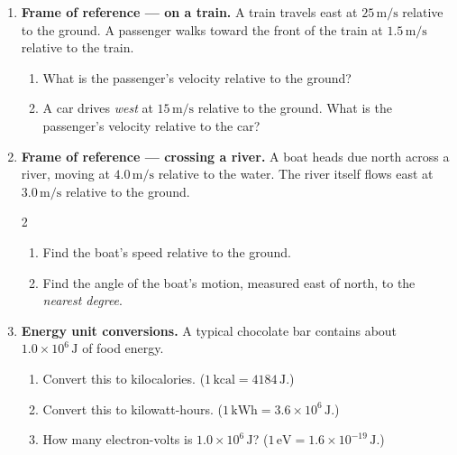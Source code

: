\documentclass[12pt, twoside]{article}
\begin{document}
\begin{enumerate}
\newpage

\item \textbf{Frame of reference --- on a train.} A train travels east at $25\,\text{m/s}$ relative to the ground. A passenger walks toward the front of the train at $1.5\,\text{m/s}$ relative to the train.
  \begin{enumerate}[itemsep=1.25cm]
    \item What is the passenger's velocity relative to the ground?
    \item A car drives \emph{west} at $15\,\text{m/s}$ relative to the ground. What is the passenger's velocity relative to the car?
    \vspace{0.5cm}
  \end{enumerate}

\item \textbf{Frame of reference --- crossing a river.} A boat heads due north across a river, moving at $4.0\,\text{m/s}$ relative to the water. The river itself flows east at $3.0\,\text{m/s}$ relative to the ground.\vspace{0.25cm}
\begin{multicols}{2}
  \begin{enumerate}[itemsep=0.8cm]
    \item Find the boat's speed relative to the ground.
    \item Find the angle of the boat's motion, measured east of north, to the \emph{nearest degree}.\vspace{1cm}
  \end{enumerate}
  \begin{flushright}
  \end{flushright}
\end{multicols}\vspace{0.5cm}

\item \textbf{Energy unit conversions.} A typical chocolate bar contains about $1.0\times 10^{6}\,\text{J}$ of food energy.
  \begin{enumerate}[itemsep=0.8cm]
    \item Convert this to kilocalories. ($1\,\text{kcal} = 4184\,\text{J}$.)
    \item Convert this to kilowatt-hours. ($1\,\text{kWh} = 3.6\times 10^{6}\,\text{J}$.)
    \item How many electron-volts is $1.0\times 10^{6}\,\text{J}$? ($1\,\text{eV} = 1.6\times 10^{-19}\,\text{J}$.)
  \end{enumerate}

\end{enumerate}
\end{document}
